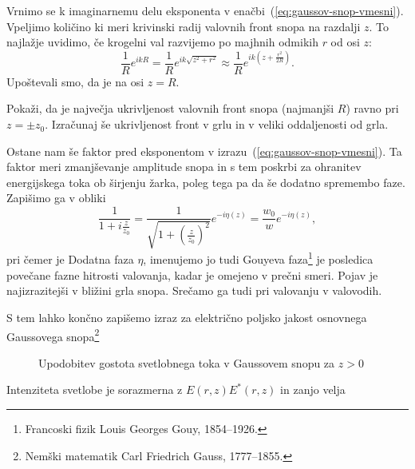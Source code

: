 Vrnimo se k imaginarnemu delu eksponenta v enačbi~(\ref{eq:gaussov-snop-vmesni}).
Vpeljimo količino 
ki meri krivinski radij valovnih front 
snopa na razdalji $z$. To najlažje
uvidimo, če krogelni val razvijemo po majhnih odmikih $r$ od osi
$z$: 
\begin{equation}
\frac{1}{R}e^{ikR}=\frac{1}{R}e^{ik\sqrt{z^{2}+r^{2}}}\approx \frac{1}{R}e^{ik(z+\frac{r^{2}}{2R})}.\label{eq:krogelni-val}
\end{equation}
 Upoštevali smo, da je na osi $z=R$.

\begin{definition}
\label{naloga-ukrivljenost-snopa}
Pokaži, da je največja ukrivljenost valovnih front snopa (najmanjši $R$) ravno pri $z=\pm z_{0}$.
Izračunaj še ukrivljenost front v grlu in v veliki oddaljenosti od grla.
\end{definition}
 
Ostane nam še faktor pred eksponentom v izrazu~(\ref{eq:gaussov-snop-vmesni}). Ta faktor meri
zmanjševanje amplitude snopa in s tem poskrbi za ohranitev energijskega
toka ob širjenju žarka, poleg tega pa da še dodatno spremembo faze. Zapišimo ga v obliki
\begin{equation}
\frac{1}{1+i\frac{z}{z_{0}}}=\frac{1}{\sqrt{1+(\frac{z}{z_0})^{2}}}e^{-i\eta(z)}=\frac{w_{0}}{w}e^{-i\eta(z)},
\end{equation}
 pri čemer je
Dodatna faza $\eta$, imenujemo jo tudi Gouyeva 
faza\footnote{Francoski fizik Louis Georges Gouy, 1854--1926.}
je posledica povečane fazne hitrosti valovanja,
kadar je omejeno v prečni smeri. Pojav je najizrazitejši v bližini
grla snopa. Srečamo ga tudi pri valovanju v valovodih.

S tem lahko končno zapišemo izraz za električno poljsko jakost osnovnega Gaussovega 
snopa\footnote{Nemški matematik Carl Friedrich Gauss, 1777--1855.}

\begin{figure}[h]
\centering
\def\svgwidth{110truemm} 

\caption{Upodobitev gostota svetlobnega toka v Gaussovem snopu za $z>0$ }
\label{fig:Gauss_3D}
\end{figure}

Intenziteta svetlobe je sorazmerna z $E(r,z)E^*(r,z)$ in zanjo velja

